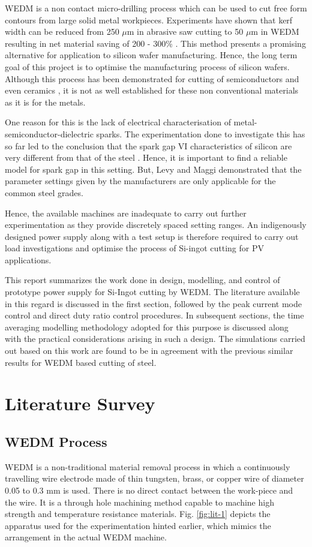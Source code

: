 \documentclass[a4paper]{IEEEtran}
\begin{document}
	WEDM is a non contact micro-drilling process which can be used to cut free form contours from large solid metal workpieces. Experiments have shown that kerf width can be reduced from 250 $\mu$m in abrasive saw cutting to 50 $\mu$m in WEDM resulting in net material saving of 200 - 300\% \cite{dongre2015multi}. This method presents a promising alternative for application to silicon wafer manufacturing. Hence, the long term goal of this project is to optimise the manufacturing process of silicon wafers. Although this process has been demonstrated for cutting of semiconductors and even ceramics \cite{sanchez2001development}, it is not as well established for these non conventional materials as it is for the metals.

	One reason for this is the lack of electrical characterisation of metal-semiconductor-dielectric sparks. The experimentation done to investigate this has so far led to the conclusion that the spark gap VI characteristics of silicon are very different from that of the steel \cite{kane2017aps}. Hence, it is important to find a reliable model for spark gap in this setting. But, Levy and Maggi \cite{levy1990wed} demonstrated that the parameter settings given by the manufacturers are only applicable for the common steel grades.

	Hence, the available machines are inadequate to carry out further experimentation as they provide discretely spaced setting ranges. An indigenously designed power supply along with a test setup is therefore required to carry out load investigations and optimise the process of Si-ingot cutting for PV applications.

	This report summarizes the work done in design, modelling, and control of prototype power supply for Si-Ingot cutting by WEDM. The literature available in this regard is discussed in the first section, followed by the peak current mode control and direct duty ratio control procedures. In subsequent sections, the time averaging modelling methodology adopted for this purpose is discussed along with the practical considerations arising in such a design. The simulations carried out based on this work are found to be in agreement with the previous similar results for WEDM based cutting of steel.

\section{Literature Survey}

\subsection{WEDM Process}
	WEDM is a non-traditional material removal process in which a continuously travelling wire electrode made of thin tungsten, brass, or copper wire of diameter 0.05 to 0.3 mm is used. There is no direct contact between the work-piece and the wire. It is a through hole machining method capable to machine high strength and temperature resistance materials. Fig. \ref{fig:lit-1} depicts the apparatus used for the experimentation hinted earlier, which mimics the arrangement in the actual WEDM machine.
\end{document}
